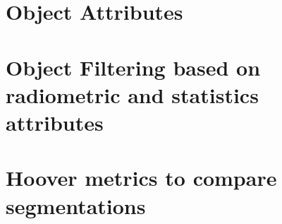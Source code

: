 \section{Object Attributes}\label{sec:ObjectAttributes}


%

\section{Object Filtering based on radiometric and statistics attributes}


\section{Hoover metrics to compare segmentations}


%

